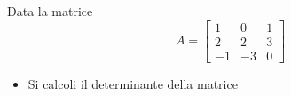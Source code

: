 Data la matrice
\bigskip
\[
A=\left[
\begin{array}{ccc}
1 & 0 & 1 \\
2 & 2 & 3\\
-1 & -3 & 0
\end{array}\right]
\]
\begin{itemize}
\item
Si calcoli il determinante della matrice

\end{itemize}
